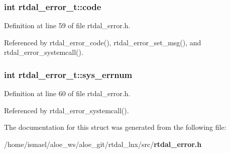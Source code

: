\subsubsection[{code}]{\setlength{\rightskip}{0pt plus 5cm}int rtdal\-\_\-error\-\_\-t\-::code}\label{structrtdal__error__t_afef22b8ccca8067d63155dc9d823cd88}


Definition at line 59 of file rtdal\-\_\-error.\-h.



Referenced by rtdal\-\_\-error\-\_\-code(), rtdal\-\_\-error\-\_\-set\-\_\-msg(), and rtdal\-\_\-error\-\_\-systemcall().

\subsubsection[{sys\-\_\-errnum}]{\setlength{\rightskip}{0pt plus 5cm}int rtdal\-\_\-error\-\_\-t\-::sys\-\_\-errnum}\label{structrtdal__error__t_aba3aa24fa1a3c37942b90a8b63f214c4}


Definition at line 60 of file rtdal\-\_\-error.\-h.



Referenced by rtdal\-\_\-error\-\_\-systemcall().



The documentation for this struct was generated from the following file\-:\begin{DoxyCompactItemize}
\item 
/home/ismael/aloe\-\_\-ws/aloe\-\_\-git/rtdal\-\_\-lnx/src/{\bf rtdal\-\_\-error.\-h}\end{DoxyCompactItemize}
